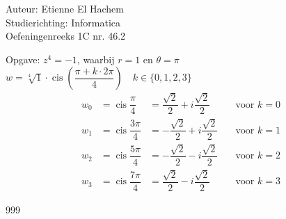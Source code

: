 \documentclass[a4paper]{article}
\newcommand{\cis}{\operatorname{cis}}
\begin{document}
  
\noindent \large Auteur: Etienne El Hachem \\
\noindent \large Studierichting: Informatica\\
\noindent \large Oefeningenreeks 1C nr. 46.2\\

\medskip

\normalsize

Opgave: $z^4 = -1$, waarbij $r = 1$ en $\theta = \pi$\\

$w = \sqrt[4]{1} \cdot \cis \left( \dfrac{\pi + k \cdot 2\pi}{4} \right) \quad k \in \{0, 1, 2, 3\}$ \\

\[
\begin{array}{lllr}
    w_0 &= \cis \dfrac{\pi}{4}  & = \dfrac{\sqrt{2}}{2} + i \dfrac{\sqrt{2}}{2} & \quad \text{voor } k = 0 \\
		
    w_1 &= \cis \dfrac{3\pi}{4} & = -\dfrac{\sqrt{2}}{2} + i \dfrac{\sqrt{2}}{2} & \quad \text{voor } k = 1 \\
		
    w_2 &= \cis \dfrac{5\pi}{4} & = -\dfrac{\sqrt{2}}{2} - i \dfrac{\sqrt{2}}{2} & \quad \text{voor } k = 2 \\
		
    w_3 &= \cis \dfrac{7\pi}{4} & = \dfrac{\sqrt{2}}{2} - i \dfrac{\sqrt{2}}{2}  & \quad \text{voor } k = 3
\end{array}
\]

\begin{thebibliography}{999}
\end{thebibliography}
\end{document}
